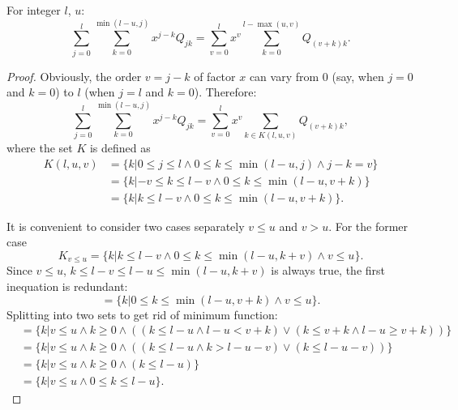 \begin{lemma}
For integer $l$, $u$:
\[
	\sum_{j=0}^l \sum_{k=0}^{\min(l-u,j)} x^{j-k} Q_{jk}
	= \sum_{v=0}^l x^v \sum_{k=0}^{l-\max(u,v)} Q_{(v+k)k}.
\]
\end{lemma}
\begin{proof}
Obviously, the order $v = j - k$ of factor $x$ can vary from $0$ (say, when $j=0$ and $k=0$) to $l$ (when $j=l$ and $k=0$).
Therefore:
\[
	\sum_{j=0}^l \sum_{k=0}^{\min(l-u,j)} x^{j-k} Q_{jk}
	= \sum_{v=0}^l x^v \sum_{k \in K(l, u, v)} Q_{(v+k)k},
\]
where the set $K$ is defined as
\begin{equation*}
\begin{split}
	K(l, u, v)
	& = \{k |
		0 \le j \le l
		\wedge 0 \le k \le \min(l - u, j)
		\wedge j - k = v
	\} \\
	& = \{k |
		-v \le k \le l - v
		\wedge 0 \le k \le \min(l - u, v + k)
	\} \\
	& = \{k |
		k \le l - v
		\wedge 0 \le k \le \min(l - u, v + k)
	\}.
\end{split}
\end{equation*}

It is convenient to consider two cases separately $v \le u$ and $v > u$.
For the former case
\[
	K_{v \le u}
	= \{k |
		k \le l - v
		\wedge 0 \le k \le \min(l - u, k + v)
		\wedge v \le u
	\}.
\]
Since $v \le u$, $k \le l - v \le l - u \le \min(l - u, k + v)$ is always true,
the first inequation is redundant:
\[
	= \{k |
		0 \le k \le \min(l - u, v + k)
		\wedge v \le u
	\}.
\]
Splitting into two sets to get rid of minimum function:
\begin{equation*}
\begin{split}
	& = \{k |
		v \le u \wedge k \ge 0
		\wedge
		(
			(k \le l - u \wedge l - u < v + k)
			\vee
			(k \le v + k \wedge l - u \ge v + k)
		)
	\} \\
	& = \{k |
		v \le u \wedge k \ge 0
		\wedge
		(
			(k \le l - u \wedge k > l - u - v)
			\vee
			(k \le l - u - v)
		)
	\} \\
	& = \{k |
		v \le u \wedge k \ge 0
		\wedge
		(k \le l - u)
	\} \\
	& = \{k | v \le u \wedge 0 \le k \le l - u \}.
\end{split}
\end{equation*}


\end{proof}
